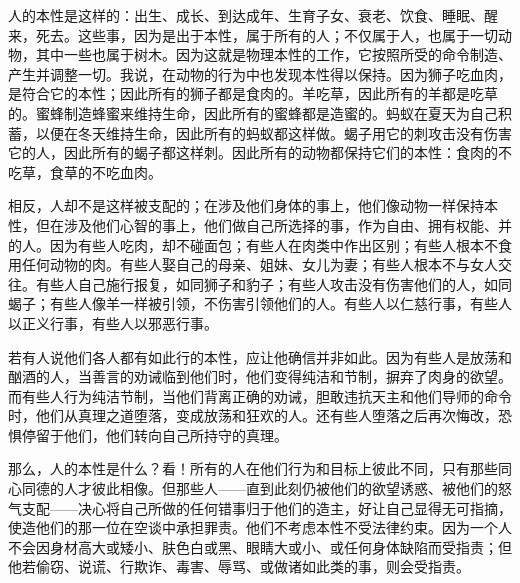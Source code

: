 人的本性是这样的：出生、成长、到达成年、生育子女、衰老、饮食、睡眠、醒来，死去。这些事，因为是出于本性，属于所有的人；不仅属于人，也属于一切动物，其中一些也属于树木。因为这就是物理本性的工作，它按照所受的命令制造、产生并调整一切。我说，在动物的行为中也发现本性得以保持。因为狮子吃血肉，是符合它的本性；因此所有的狮子都是食肉的。羊吃草，因此所有的羊都是吃草的。蜜蜂制造蜂蜜来维持生命，因此所有的蜜蜂都是造蜜的。蚂蚁在夏天为自己积蓄，以便在冬天维持生命，因此所有的蚂蚁都这样做。蝎子用它的刺攻击没有伤害它的人，因此所有的蝎子都这样刺。因此所有的动物都保持它们的本性：食肉的不吃草，食草的不吃血肉。\par

相反，人却不是这样被支配的；在涉及他们身体的事上，他们像动物一样保持本性，但在涉及他们心智的事上，他们做自己所选择的事，作为自由、拥有权能、并的人。因为有些人吃肉，却不碰面包；有些人在肉类中作出区别；有些人根本不食用任何动物的肉。有些人娶自己的母亲、姐妹、女儿为妻；有些人根本不与女人交往。有些人自己施行报复，如同狮子和豹子；有些人攻击没有伤害他们的人，如同蝎子；有些人像羊一样被引领，不伤害引领他们的人。有些人以仁慈行事，有些人以正义行事，有些人以邪恶行事。\par

若有人说他们各人都有如此行的本性，应让他确信并非如此。因为有些人是放荡和酗酒的人，当善言的劝诫临到他们时，他们变得纯洁和节制，摒弃了肉身的欲望。而有些人行为纯洁节制，当他们背离正确的劝诫，胆敢违抗天主和他们导师的命令时，他们从真理之道堕落，变成放荡和狂欢的人。还有些人堕落之后再次悔改，恐惧停留于他们，他们转向自己所持守的真理。\par

那么，人的本性是什么？看！所有的人在他们行为和目标上彼此不同，只有那些同心同德的人才彼此相像。但那些人——直到此刻仍被他们的欲望诱惑、被他们的怒气支配——决心将自己所做的任何错事归于他们的造主，好让自己显得无可指摘，使造他们的那一位在空谈中承担罪责。他们不考虑本性不受法律约束。因为一个人不会因身材高大或矮小、肤色白或黑、眼睛大或小、或任何身体缺陷而受指责；但他若偷窃、说谎、行欺诈、毒害、辱骂、或做诸如此类的事，则会受指责。\par

\par

\par

